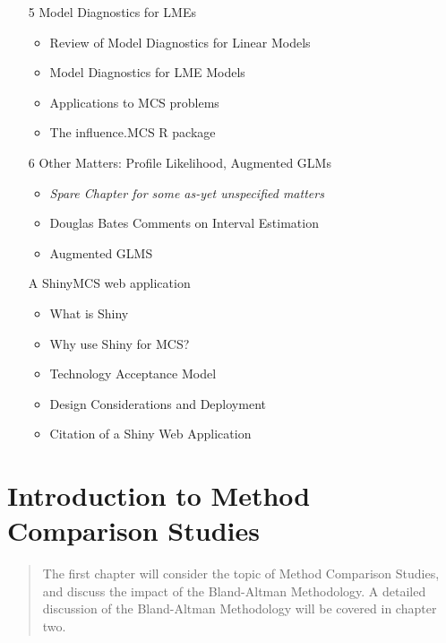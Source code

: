 \documentclass{report}
\begin{document}
\begin{itemize}
	
	\item[5]	Model Diagnostics for LMEs 
	\begin{itemize}	
		\item	Review of Model Diagnostics for Linear Models
		\item	Model Diagnostics for LME Models
		\item	Applications to MCS problems
		\item   The influence.MCS R package
	\end{itemize}		
	
	
	
	\item[6]	Other Matters: Profile Likelihood, Augmented GLMs	
	\begin{itemize}	
		\item   \textit{Spare Chapter for some as-yet unspecified matters}	
		\item	Douglas Bates Comments on Interval Estimation
		\item	Augmented GLMS
			
	\end{itemize}			
	
	\item[A]   ShinyMCS web application
	\begin{itemize}
		\item What is Shiny
		\item Why use Shiny for MCS?
		\item Technology Acceptance Model
		\item Design Considerations and Deployment
		\item Citation of a Shiny Web Application
	\end{itemize}
\end{itemize}		
\newpage
\chapter{Introduction to Method Comparison Studies}
\begin{abstract}
The first chapter will consider the topic of Method Comparison Studies, and discuss the impact of the Bland-Altman Methodology. A detailed discussion of the Bland-Altman Methodology will be covered in chapter two.
\end{abstract}
\end{document}
